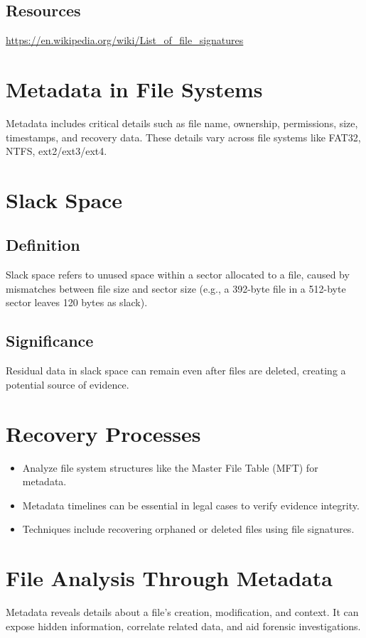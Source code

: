 \subsection{Resources}
\url{https://en.wikipedia.org/wiki/List_of_file_signatures}

\section{Metadata in File Systems}
Metadata includes critical details such as file name, ownership, permissions, size, timestamps, and recovery data. These details vary across file systems like FAT32, NTFS, ext2/ext3/ext4.

\section{Slack Space}
\subsection{Definition}
Slack space refers to unused space within a sector allocated to a file, caused by mismatches between file size and sector size (e.g., a 392-byte file in a 512-byte sector leaves 120 bytes as slack).
\subsection{Significance}
Residual data in slack space can remain even after files are deleted, creating a potential source of evidence.

\section{Recovery Processes}
\begin{itemize}
    \item Analyze file system structures like the Master File Table (MFT) for metadata.
    \item Metadata timelines can be essential in legal cases to verify evidence integrity.
    \item Techniques include recovering orphaned or deleted files using file signatures.
\end{itemize}

\section{File Analysis Through Metadata}
Metadata reveals details about a file’s creation, modification, and context. It can expose hidden information, correlate related data, and aid forensic investigations.

